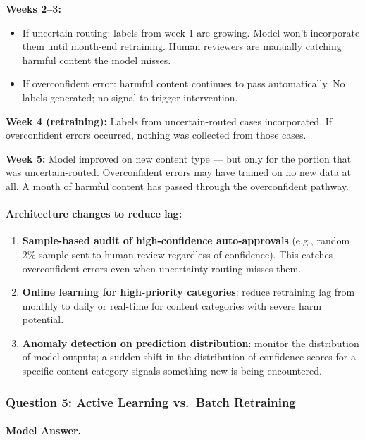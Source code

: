 \textbf{Weeks 2--3:}
\begin{itemize}
    \item If uncertain routing: labels from week 1 are growing. Model won't incorporate them until month-end retraining. Human reviewers are manually catching harmful content the model misses.
    \item If overconfident error: harmful content continues to pass automatically. No labels generated; no signal to trigger intervention.
\end{itemize}

\textbf{Week 4 (retraining):} Labels from uncertain-routed cases incorporated. If overconfident errors occurred, nothing was collected from those cases.

\textbf{Week 5:} Model improved on new content type --- but only for the portion that was uncertain-routed. Overconfident errors may have trained on no new data at all. A month of harmful content has passed through the overconfident pathway.

\paragraph{Architecture changes to reduce lag:}
\begin{enumerate}
    \item \textbf{Sample-based audit of high-confidence auto-approvals} (e.g., random 2\% sample sent to human review regardless of confidence). This catches overconfident errors even when uncertainty routing misses them.
    \item \textbf{Online learning for high-priority categories}: reduce retraining lag from monthly to daily or real-time for content categories with severe harm potential.
    \item \textbf{Anomaly detection on prediction distribution}: monitor the distribution of model outputs; a sudden shift in the distribution of confidence scores for a specific content category signals something new is being encountered.
\end{enumerate}

\subsubsection{Question 5: Active Learning vs.\ Batch Retraining}

\paragraph{Model Answer.}

